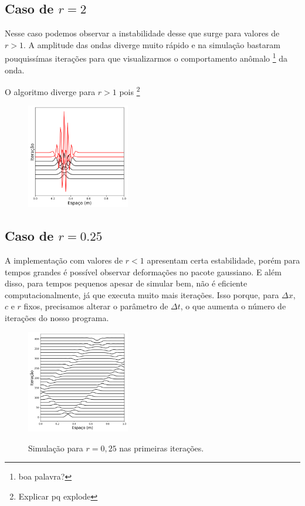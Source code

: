 \documentclass[a4paper, 11pt]{article}
\begin{document}
\clearpage
\subsection{Caso de \( r = 2 \) }


Nesse caso podemos observar a instabilidade desse que surge para valores de \( r > 1  \).
A amplitude das ondas diverge muito rápido e na simulação bastaram pouquissímas iterações
para que visualizarmos o comportamento anômalo \footnote{boa palavra?} da onda.

O algoritmo diverge para \( r > 1 \) pois \footnote{Explicar pq explode}

\begin{figure}[h!] 
    \centering
    \centering
    \includegraphics[width=0.4\textwidth]{graf-tarefa1-b}
    \caption{}
    \label{fig:tarefa1-b}
\end{figure}

\subsection{Caso de \( r = 0.25 \) }

A implementação com valores de \( r < 1 \) apresentam certa estabilidade, porém para tempos
grandes é possível observar deformações no pacote gaussiano. E além disso, para tempos pequenos
apesar de simular bem, não é eficiente computacionalmente, já que executa muito mais iterações. Isso porque, para
\( \Delta x \), \( c \) e \( r \) fixos, precisamos alterar o parâmetro de \( \Delta t \), o que aumenta
o número de iterações do nosso programa.

\begin{figure}[h!] 
    \centering
    \caption{Simulação para \( r = 0,25 \) nas primeiras iterações.}
    \includegraphics[width=0.4\textwidth]{graf-tarefa1-c1}
    \label{fig:tarefa1-c1}
\end{figure}
\end{document}
